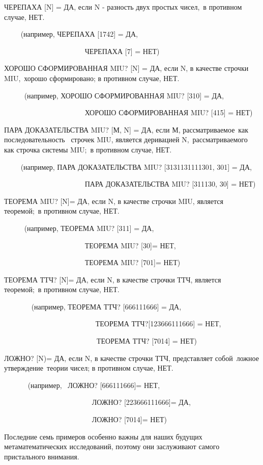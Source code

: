 \documentclass[../main.tex]{subfiles}
\begin{document}
ЧЕРЕПАХА {[}N{]} = ДА, если N - разность двух простых чисел,~в противном случае, НЕТ.

~~~~ (например, ЧЕРЕПАХА {[}1742{]} = ДА,

~~~~~~~~~~~~~~~~~~~~~~ ЧЕРЕПАХА {[}7{]} = НЕТ)

ХОРОШО СФОРМИРОВАННАЯ MIU? {[}N{]} = ДА, если N, в качестве строчки MIU,~хорошо сформировано; в противном случае, НЕТ.

~~~~~ (например, ХОРОШО СФОРМИРОВАННАЯ MIU? {[}310{]} = ДА,

~~~~~~~~~~~~~~~~~~~~~~ ХОРОШО СФОРМИРОВАННАЯ MIU? {[}415{]} = НЕТ)

ПАРА ДОКАЗАТЕЛЬСТВА MIU? {[}М, N{]} = ДА, если М, рассматриваемое~как~ последовательность~ строчек MIU, является деривацией N,~рассматриваемого~ как строчка системы MIU;~в противном случае, НЕТ.

~~~~ (например, ПАРА ДОКАЗАТЕЛЬСТВА MIU? {[}3131131111301, 301{]} = ДА,

~~~~~~~~~~~~~~~~~~~~~~ ПАРА ДОКАЗАТЕЛЬСТВА MIU? {[}311130, 30{]} = НЕТ)

ТЕОРЕМА MIU? {[}N{]}= ДА, если N, в качестве строчки MIU, является теоремой;~в противном случае, НЕТ.

~~~~~ (например, ТЕОРЕМА MIU? {[}311{]} = ДА,

~~~~~~~~~~~~~~~~~~~~~~ ТЕОРЕМА MIU? {[}30{]}= НЕТ,

~~~~~~~~~~~~~~~~~~~~~ ~ТЕОРЕМА MIU? {[}701{]}= НЕТ)

ТЕОРЕМА ТТЧ? {[}N{]}= ДА, если N, в качестве строчки ТТЧ, является теоремой;~в противном случае, НЕТ.

~~~~~~~ (например, ТЕОРЕМА ТТЧ? {[}666111666{]} = ДА,

~~~~~~~~~~~~~~~~~~~~~~~~~ ТЕОРЕМА ТТЧ?{[}123666111666{]} = НЕТ,

~~~~~~~~~~~~~~~~~~~~~~~~~~ТЕОРЕМА ТТЧ? {[}7014{]} = НЕТ)

ЛОЖНО? {[}N)= ДА, если N, в качестве строчки ТТЧ, представляет собой~ложное утверждение~теории чисел; в противном случае, НЕТ.

~~~~~~ (например,~ ЛОЖНО? {[}666111666{]}= НЕТ,

~~~~~~~~~~~~~~~~~~~~~~~~ ЛОЖНО? {[}223666111666{]}= ДА,

~~~~~~~~~~~~~~~~~~~~~~~ ~ЛОЖНО? {[}7014{]}= НЕТ)

Последние семь примеров особенно важны для наших будущих метаматематических исследований, поэтому они заслуживают самого пристального внимания.
\end{document}
